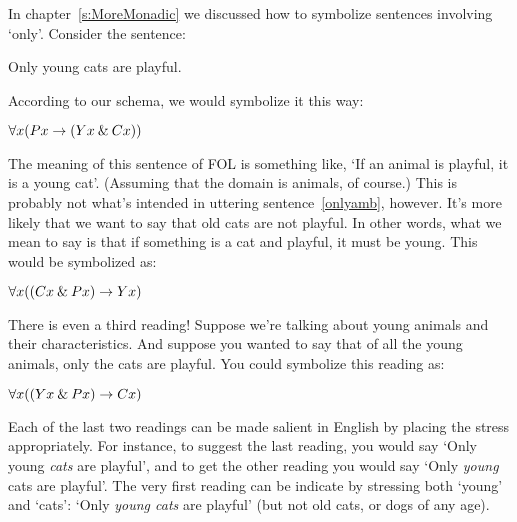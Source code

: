 In chapter~\ref{s:MoreMonadic} we discussed how to symbolize sentences involving `only'. Consider the sentence:
\begin{earg}
	\item[\ex{onlyamb}] Only young cats are playful.
\end{earg}
According to our schema, we would symbolize it this way:
\begin{earg}
	\prem $\forall x({P}{x} \rightarrow ({Y}{x} \mathbin{\&} {C}{x}))$
\end{earg}
The meaning of this sentence of FOL is something like, `If an animal is playful, it is a young cat'. (Assuming that the domain is animals, of course.) This is probably not what's intended in uttering sentence~\ref{onlyamb}, however. It's more likely that we want to say that old cats are not playful. In other words, what we mean to say is that if something is a cat and playful, it must be young. This would be symbolized as:
\begin{earg}
	\prem $\forall x(({C}{x} \mathbin{\&} {P}{x}) \rightarrow {Y}{x})$
\end{earg}
There is even a third reading! Suppose we're talking about young animals and their characteristics. And suppose you wanted to say that of all the young animals, only the cats are playful. You could symbolize this reading as:
\begin{earg}
	\prem $\forall x(({Y}{x} \mathbin{\&} {P}{x}) \rightarrow {C}{x})$
\end{earg}
Each of the last two readings can be made salient in English by placing the stress appropriately. For instance, to suggest the last reading, you would say `Only young \emph{cats} are playful', and to get the other reading you would say `Only \emph{young} cats are playful'.  The very first reading can be indicate by stressing both `young' and `cats': `Only \emph{young cats} are playful' (but not old cats, or dogs of any age).

